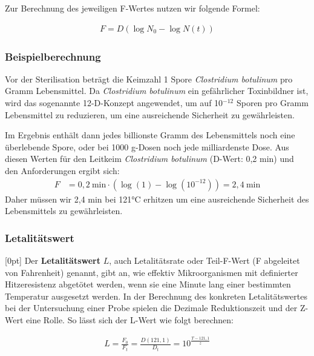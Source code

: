 \documentclass[a4paper,10pt]{article}
\renewcommand{\textbf}[1]{\textsf{{\bfseries {#1}}}}
\begin{document}
\pp
Zur Berechnung des jeweiligen F-Wertes nutzen wir folgende Formel:

\begin{align*}
F = D(\log N_0 - \log N(t) )
\end{align*}

\subsubsection{Beispielberechnung}
Vor der Sterilisation beträgt die Keimzahl 1 Spore \textit{Clostridium botulinum} pro Gramm Lebensmittel. Da \textit{Clostridium botulinum} ein gefährlicher Toxinbildner ist, wird das sogenannte 12-D-Konzept angewendet, um auf 10$^{-12}$ Sporen pro Gramm Lebensmittel zu reduzieren, um eine ausreichende Sicherheit zu gewährleisten.\par 
Im Ergebnis enthält dann jedes billionste Gramm des Lebensmittels noch eine überlebende Spore, oder bei 1000 g-Dosen noch jede milliardenste Dose. Aus diesen Werten für den Leitkeim \textit{Clostridium botulinum} (D-Wert: 0,2 min) und den Anforderungen ergibt sich:
\begin{align*}
F &= 0,2 ~\text{min} \cdot (\log (1) - \log (10^{-12})) = 2,4 ~\text{min}
\end{align*}
Daher müssen wir 2,4 min bei 121°C erhitzen um eine ausreichende Sicherheit des Lebensmittels zu gewährleisten.






\subsubsection{Letalitätswert}

\marginnote[Je kleiner der Letalitätswert, desto effektiver \pp L = 1 \RA 121°C bei 1min \par L = 0,1 \RA 121°C bei 0,1min]{}[0pt]
Der \textbf{Letalitätswert} $L$, auch Letalitätsrate oder Teil-F-Wert (F abgeleitet von Fahrenheit) genannt, gibt an, wie effektiv Mikroorganismen mit definierter Hitzeresistenz abgetötet werden, wenn sie eine Minute lang einer bestimmten Temperatur ausgesetzt werden.
\pp
In der Berechnung des konkreten Letalitätswertes bei der Untersuchung einer Probe spielen die Dezimale Reduktionszeit und der Z-Wert eine Rolle.
\pp
So lässt sich der L-Wert wie folgt berechnen:


\begin{align*}
L = \frac{F_0}{F_t} = \frac{D(121,1)}{D_t} = 10^{\frac{T-121,1}{z}}
\end{align*}
\end{document}
